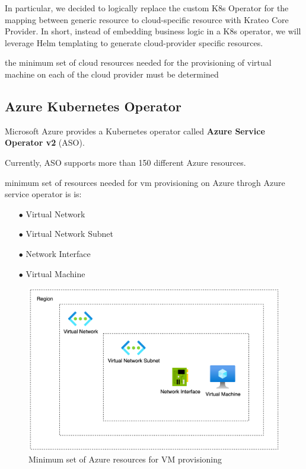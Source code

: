 In particular, we decided to logically replace the custom K8s Operator for the mapping between generic resource to cloud-specific resource with Krateo Core Provider. In short, instead of embedding business logic in a K8s operator, we will leverage Helm templating to generate cloud-provider specific resources.


the minimum set of cloud resources needed for the provisioning of virtual machine on each of the cloud provider must be determined





\subsection{Azure Kubernetes Operator}

Microsoft Azure provides a Kubernetes operator called \textbf{Azure Service Operator v2} (ASO).

Currently, ASO supports more than 150 different Azure resources.


minimum set of resources needed for vm provisioning on Azure throgh Azure service operator is is:

\begin{itemize}[itemsep=0.2pt, topsep=1pt] \item[$\bullet$] Virtual Network 
\item[$\bullet$] Virtual Network Subnet
\item[$\bullet$] Network Interface
\item[$\bullet$] Virtual Machine
\end{itemize}

\begin{figure}[htb]
\centering
\includegraphics[width=0.75\linewidth]{images/azure.png}
\caption{Minimum set of Azure resources for VM provisioning}
\label{fig:azure}
\end{figure}






